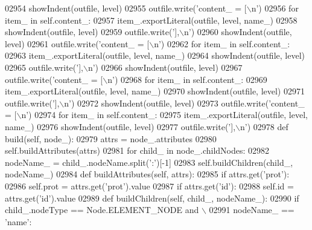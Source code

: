 \begin{DoxyCode}
{{{{{{{{{{{{{{{{{{{{{{{{{{{{{{{{{{{{{{{{{{{{{{{{{{{{{{{{{{{{{{{{{{{{{{{{{{{{{{{{{{{{{{{{{{{{{{{{{{{{{{{{{{{{{{{{{{{{{{{{{{{{{{{{{{{{{{{{{{{{{{{{{{{{{{{{{{{{{{{{{{{{{{{{{{{{{{{{{{{{{{{{{{{{{{{{{{{{{{{{{{{02954         showIndent(outfile, level)
02955         outfile.write(\textcolor{stringliteral}{'content\_ = [\(\backslash\)n'})
02956         \textcolor{keywordflow}{for} item\_ \textcolor{keywordflow}{in} self.content_:
02957             item\_.exportLiteral(outfile, level, name\_)
02958         showIndent(outfile, level)
02959         outfile.write(\textcolor{stringliteral}{'],\(\backslash\)n'})
02960         showIndent(outfile, level)
02961         outfile.write(\textcolor{stringliteral}{'content\_ = [\(\backslash\)n'})
02962         \textcolor{keywordflow}{for} item\_ \textcolor{keywordflow}{in} self.content_:
02963             item\_.exportLiteral(outfile, level, name\_)
02964         showIndent(outfile, level)
02965         outfile.write(\textcolor{stringliteral}{'],\(\backslash\)n'})
02966         showIndent(outfile, level)
02967         outfile.write(\textcolor{stringliteral}{'content\_ = [\(\backslash\)n'})
02968         \textcolor{keywordflow}{for} item\_ \textcolor{keywordflow}{in} self.content_:
02969             item\_.exportLiteral(outfile, level, name\_)
02970         showIndent(outfile, level)
02971         outfile.write(\textcolor{stringliteral}{'],\(\backslash\)n'})
02972         showIndent(outfile, level)
02973         outfile.write(\textcolor{stringliteral}{'content\_ = [\(\backslash\)n'})
02974         \textcolor{keywordflow}{for} item\_ \textcolor{keywordflow}{in} self.content_:
02975             item\_.exportLiteral(outfile, level, name\_)
02976         showIndent(outfile, level)
02977         outfile.write(\textcolor{stringliteral}{'],\(\backslash\)n'})
02978     \textcolor{keyword}{def }build(self, node\_):
02979         attrs = node\_.attributes
02980         self.buildAttributes(attrs)
02981         \textcolor{keywordflow}{for} child\_ \textcolor{keywordflow}{in} node\_.childNodes:
02982             nodeName\_ = child\_.nodeName.split(\textcolor{stringliteral}{':'})[-1]
02983             self.buildChildren(child\_, nodeName\_)
02984     \textcolor{keyword}{def }buildAttributes(self, attrs):
02985         \textcolor{keywordflow}{if} attrs.get(\textcolor{stringliteral}{'prot'}):
02986             self.prot = attrs.get(\textcolor{stringliteral}{'prot'}).value
02987         \textcolor{keywordflow}{if} attrs.get(\textcolor{stringliteral}{'id'}):
02988             self.id = attrs.get(\textcolor{stringliteral}{'id'}).value
02989     \textcolor{keyword}{def }buildChildren(self, child\_, nodeName\_):
02990         \textcolor{keywordflow}{if} child\_.nodeType == Node.ELEMENT\_NODE \textcolor{keywordflow}{and} \(\backslash\)
02991             nodeName\_ == \textcolor{stringliteral}{'name'}:
}}}}}}}}}}}}}}}}}}}}}}}}}}}}}}}}}}}}}}}}}}}}}}}}}}}}}}}}}}}}}}}}}}}}}}}}}}}}}}}}}}}}}}}}}}}}}}}}}}}}}}}}}}}}}}}}}}}}}}}}}}}}}}}}}}}}}}}}}}}}}}}}}}}}}}}}}}}}}}}}}}}}}}}}}}}}}}}}}}}}}}}}}}}}}}}}}}}}}}}}}}}
\end{DoxyCode}
